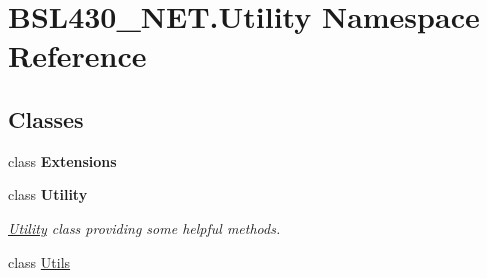 \hypertarget{namespace_b_s_l430___n_e_t_1_1_utility}{}\section{B\+S\+L430\+\_\+\+N\+E\+T.\+Utility Namespace Reference}
\label{namespace_b_s_l430___n_e_t_1_1_utility}
\subsection*{Classes}
\begin{DoxyCompactItemize}
\item 
class {\bfseries Extensions}
\item 
class {\bfseries Utility}
\begin{DoxyCompactList}\small\item\em \mbox{\hyperlink{namespace_b_s_l430___n_e_t_1_1_utility}{Utility}} class providing some helpful methods. \end{DoxyCompactList}\item 
class \mbox{\hyperlink{class_b_s_l430___n_e_t_1_1_utility_1_1_utils}{Utils}}
\end{DoxyCompactItemize}
